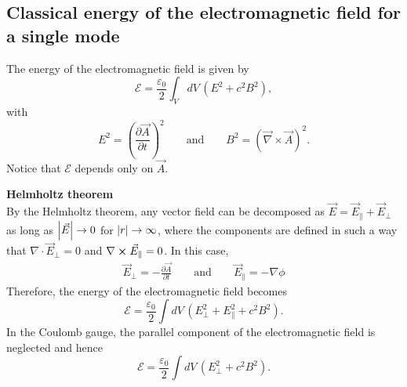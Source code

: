 \subsection{Classical energy of the electromagnetic field for a single mode}
The energy of the electromagnetic field is given by
\begin{equation}
    \mathcal{E} =\frac{\varepsilon_0}{2} \int_{V} dV \, \left( E^{2}+c^{2}B^{2} \right),
    \label{eq:energy}
\end{equation}
with 
\begin{equation}
    E^2 = \left( \frac{\partial \vec{A}}{\partial t} \right)^2 \qquad \text{and} \qquad B^2 = (\vec{\nabla} \times \vec{A})^2.
    \label{eq:EBsm}
\end{equation}
Notice that $\mathcal{E}$ depends only on $\vec{A}$.

\begin{tcolorbox}
\textbf{Helmholtz theorem} \\
By the Helmholtz theorem, any vector field can be decomposed as $\Vec{E}=\Vec{E}_{\parallel}+\Vec{E}_\perp$ as long as $\abs{\Vec{E}}\rightarrow0$ for $\abs{r}\rightarrow\infty$, where the components are defined in such a way that $\nabla\cdot\Vec{E}_{\perp}=0$ and $\nabla\cross\Vec{E}_{\parallel}=0$. In this case, 
\begin{align*}
    \Vec{E}_{\perp}=-\frac{\partial \vec{A}}{\partial t} \qquad \text{and} \qquad \Vec{E}_{\parallel}=-\nabla\phi
\end{align*}
Therefore, the energy of the electromagnetic field becomes 
\begin{equation*}
    \mathcal{E} = \frac{\varepsilon_0}{2}\int dV \, (E_{\perp}^2+E_{\parallel}^2+c^2B^2).
\end{equation*}
In the Coulomb gauge, the parallel component of the electromagnetic field is neglected and hence
\begin{equation*}
     \mathcal{E} = \frac{\varepsilon_0}{2} \int dV \, (E_{\perp}^2+c^2B^2). 
\end{equation*}
\end{tcolorbox}

